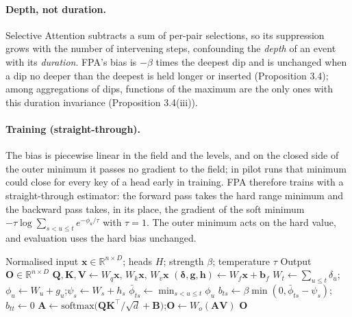 \paragraph{Depth, not duration.} Selective Attention subtracts a sum of per-pair selections, so its suppression grows with the number of intervening steps, confounding the \emph{depth} of an event with its \emph{duration}. FPA's bias is $-\beta$ times the deepest dip and is unchanged when a dip no deeper than the deepest is held longer or inserted (Proposition 3.4); among aggregations of dips, functions of the maximum are the only ones with this duration invariance (Proposition 3.4(iii)).

\paragraph{Training (straight-through).} The bias is piecewise linear in the field and the levels, and on the closed side of the outer minimum it passes no gradient to the field; in pilot runs that minimum could close for every key of a head early in training. FPA therefore trains with a straight-through estimator: the forward pass takes the hard range minimum and the backward pass takes, in its place, the gradient of the soft minimum $-\tau\log\sum_{s<u\le t}e^{-\phi_u/\tau}$ with $\tau=1$. The outer minimum acts on the hard value, and evaluation uses the hard bias unchanged.

\begin{algorithm}[H]
\caption{First Passage Attention (Parallel Reference Form)}
\begin{algorithmic}[1]
\Require Normalised input $\mathbf{x}\in\mathbb{R}^{n\times D}$; heads $H$; strength $\beta$; temperature $\tau$
\Ensure Output $\mathbf{O}\in\mathbb{R}^{n\times D}$
\State $\mathbf{Q},\mathbf{K},\mathbf{V}\gets W_q\mathbf{x},\,W_k\mathbf{x},\,W_v\mathbf{x}$ 
\State $(\boldsymbol{\delta},\mathbf{g},\mathbf{h})\gets W_f\mathbf{x}+ \mathbf{b}_f$ 
\State $W_t\gets\sum_{u\le t}\delta_u$;\quad $\phi_u\gets W_u+g_u$;\quad $\psi_s\gets W_s+h_s$
\State $\bar{\phi}_{ts}\gets\min_{s<u\le t}\phi_u$ 
\State $b_{ts}\gets\beta\min(0,\bar{\phi}_{ts}-\psi_s)$;\quad $b_{tt}\gets 0$
\State $\mathbf{A}\gets\mathrm{softmax}\bigl(\mathbf{Q}\mathbf{K}^\top/\sqrt{d}+\mathbf{B}\bigr)$;\quad $\mathbf{O}\gets W_o(\mathbf{A}\mathbf{V})$
\State \Return $\mathbf{O}$ 
\end{algorithmic}
\end{algorithm}

